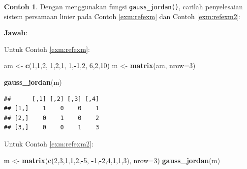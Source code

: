 \documentclass[
]{book}
\newenvironment{Shaded}{\begin{snugshade}}{\end{snugshade}}
\newcommand{\AttributeTok}[1]{\textcolor[rgb]{0.13,0.29,0.53}{#1}}
\newcommand{\DecValTok}[1]{\textcolor[rgb]{0.00,0.00,0.81}{#1}}
\newcommand{\FunctionTok}[1]{\textcolor[rgb]{0.13,0.29,0.53}{\textbf{#1}}}
\newcommand{\NormalTok}[1]{#1}
\newcommand{\OtherTok}[1]{\textcolor[rgb]{0.56,0.35,0.01}{#1}}
\newcommand{\SpecialCharTok}[1]{\textcolor[rgb]{0.81,0.36,0.00}{\textbf{#1}}}
\theoremstyle{definition}
\theoremstyle{definition}
\newtheorem{example}{Contoh}[chapter]
\theoremstyle{definition}
\theoremstyle{definition}
\theoremstyle{remark}
\begin{document}
\begin{example}
\protect\hypertarget{exm:gaussjordanexm2}{}\label{exm:gaussjordanexm2}Dengan menggunakan fungsi \texttt{gauss\_jordan()}, carilah penyelesaian sistem persamaan linier pada Contoh \ref{exm:refexm} dan Contoh \ref{exm:refexm2}:
\end{example}

\textbf{Jawab}:

Untuk Contoh \ref{exm:refexm}:

\begin{Shaded}
\begin{Highlighting}[]
\NormalTok{am }\OtherTok{\textless{}{-}} \FunctionTok{c}\NormalTok{(}\DecValTok{1}\NormalTok{,}\DecValTok{1}\NormalTok{,}\DecValTok{2}\NormalTok{,}
        \DecValTok{1}\NormalTok{,}\DecValTok{2}\NormalTok{,}\DecValTok{1}\NormalTok{,}
        \DecValTok{1}\NormalTok{,}\SpecialCharTok{{-}}\DecValTok{1}\NormalTok{,}\DecValTok{2}\NormalTok{,}
        \DecValTok{6}\NormalTok{,}\DecValTok{2}\NormalTok{,}\DecValTok{10}\NormalTok{)}
\NormalTok{m }\OtherTok{\textless{}{-}} \FunctionTok{matrix}\NormalTok{(am, }\AttributeTok{nrow=}\DecValTok{3}\NormalTok{)}

\FunctionTok{gauss\_jordan}\NormalTok{(m)}
\end{Highlighting}
\end{Shaded}

\begin{verbatim}
##      [,1] [,2] [,3] [,4]
## [1,]    1    0    0    1
## [2,]    0    1    0    2
## [3,]    0    0    1    3
\end{verbatim}

Untuk Contoh \ref{exm:refexm2}:

\begin{Shaded}
\begin{Highlighting}[]
\NormalTok{m }\OtherTok{\textless{}{-}} \FunctionTok{matrix}\NormalTok{(}\FunctionTok{c}\NormalTok{(}\DecValTok{2}\NormalTok{,}\DecValTok{3}\NormalTok{,}\DecValTok{1}\NormalTok{,}\DecValTok{1}\NormalTok{,}\DecValTok{2}\NormalTok{,}\SpecialCharTok{{-}}\DecValTok{5}\NormalTok{,}
              \SpecialCharTok{{-}}\DecValTok{1}\NormalTok{,}\SpecialCharTok{{-}}\DecValTok{2}\NormalTok{,}\DecValTok{4}\NormalTok{,}\DecValTok{1}\NormalTok{,}\DecValTok{1}\NormalTok{,}\DecValTok{3}\NormalTok{), }
            \AttributeTok{nrow=}\DecValTok{3}\NormalTok{)}
\FunctionTok{gauss\_jordan}\NormalTok{(m)}
\end{Highlighting}
\end{Shaded}
\end{document}
